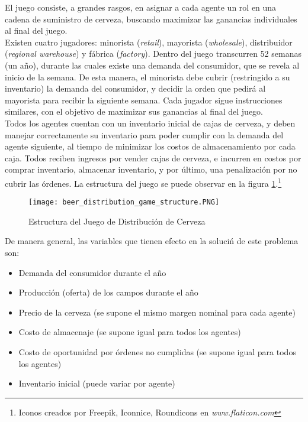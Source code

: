 El juego consiste, a grandes rasgos, en asignar a cada agente un rol en una cadena de suministro de cerveza, buscando maximizar las ganancias individuales al final del juego.\\

Existen cuatro jugadores: minorista (\textit{retail}), mayorista (\textit{wholesale}), distribuidor (\textit{regional warehouse}) y f\'abrica (\textit{factory}). Dentro del juego transcurren 52 semanas (un a\~no), durante las cuales existe una demanda del consumidor, que se revela al inicio de la semana. De esta manera, el minorista debe cubrir (restringido a su inventario) la demanda del consumidor, y decidir la orden que pedir\'a al mayorista para recibir la siguiente semana. Cada jugador sigue instrucciones similares, con el objetivo de maximizar sus ganancias al final del juego.\\

Todos los agentes cuentan con un inventario inicial de cajas de cerveza, y deben manejar correctamente su inventario para poder cumplir con la demanda del agente siguiente, al tiempo de minimizar los costos de almacenamiento por cada caja. Todos reciben ingresos por vender cajas de cerveza, e incurren en costos por comprar inventario, almacenar inventario, y por \'ultimo, una penalizaci\'on por no cubrir las \'ordenes. La estructura del juego se puede observar en la figura \ref{structure}.\footnote{Iconos creados por Freepik, Iconnice, Roundicons en \textit{www.flaticon.com}}\\


\begin{figure}[ht]
\caption{Estructura del Juego de Distribución de Cerveza}
\label{structure}
\texttt{[image: beer\_distribution\_game\_structure.PNG]}
\centering
\end{figure}

De manera general, las variables que tienen efecto en la soluci\'n de este problema son:

\begin{itemize}
    \item Demanda del consumidor durante el a\~no
    \item Producci\'on (oferta) de los campos durante el a\~no
    \item Precio de la cerveza (se supone el mismo margen nominal para cada agente)
    \item Costo de almacenaje (se supone igual para todos los agentes)
    \item Costo de oportunidad por \'ordenes no cumplidas (se supone igual para todos los agentes)
    \item Inventario inicial (puede variar por agente)
\end{itemize}

